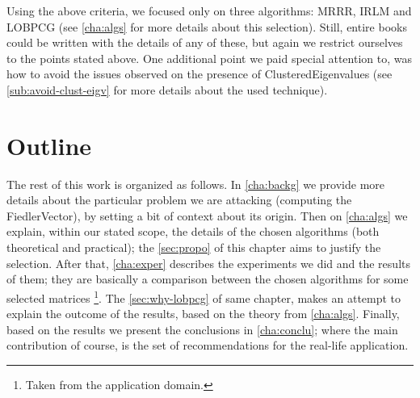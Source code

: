Using the above criteria, we focused only on three algorithms: \gls{MRRR},
\gls{IRLM} and \gls{LOBPCG} (see \cref{cha:algs} for more details
about this selection). Still, entire books could be written with the 
details of any of these, but again we restrict ourselves to the points
stated above. One additional point we paid 
special attention to, was how to avoid the issues observed on the
presence of \gls{ClusteredEigenvalues} (see
\cref{sub:avoid-clust-eigv} for more details about the used
technique). 

\section{Outline}

The rest of this work is organized as follows. In \cref{cha:backg} we
provide more details about the particular problem we are attacking
(computing the \gls{FiedlerVector}), by setting a bit of context about
its origin. Then on \cref{cha:algs} we explain, within
our stated scope, the details of the chosen algorithms (both
theoretical and practical); the \cref{sec:propo} of this chapter aims
to justify the selection.  After that, \cref{cha:exper}
describes the experiments we did and the results of them; they are
basically a comparison between the chosen algorithms for some selected
matrices \footnote{Taken
  from the application domain.}. The \cref{sec:why-lobpcg} of same
chapter,  makes an attempt to explain the outcome of the results,
based on the theory from \cref{cha:algs}. Finally, based  
on the results we present the conclusions in \cref{cha:conclu}; where
the main contribution of course, is the set of recommendations for the
real-life application.

